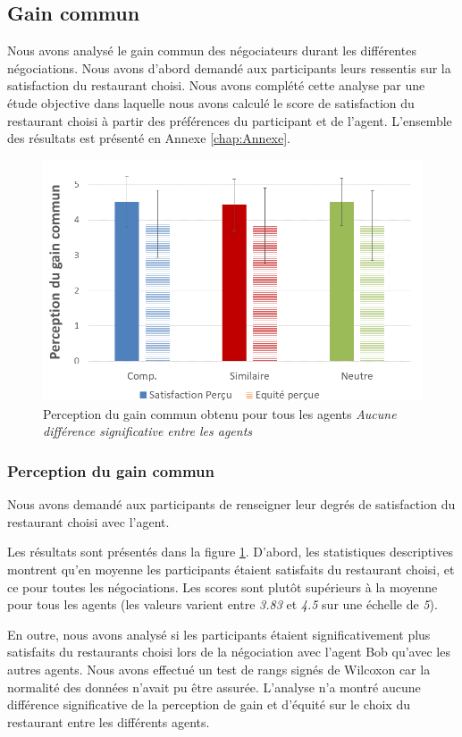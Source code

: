 	\subsection{Gain commun}
	Nous avons analysé le gain commun des négociateurs durant les différentes négociations. Nous avons d'abord demandé aux participants leurs ressentis sur la satisfaction du restaurant choisi. Nous avons complété cette analyse par une étude objective dans laquelle nous avons calculé le score de satisfaction du restaurant choisi à partir des préférences du participant et de l'agent. L'ensemble des résultats est présenté en Annexe \ref{chap:Annexe}.
	
		\begin{figure}[h]
		
		\centering
		\includegraphics[width= 0.65 \linewidth,clip=false]{Figures/chap7/percpGain.PNG}
		\caption{Perception du gain commun obtenu pour tous les agents \textit{Aucune différence significative entre les agents}}
		\label{fig:gainCom}
	\end{figure}

	\subsubsection{Perception du gain commun} Nous avons demandé aux participants de renseigner leur degrés de satisfaction du restaurant choisi avec l'agent.
	
	Les résultats sont présentés dans la figure \ref{fig:gainCom}. D'abord, les statistiques descriptives montrent qu'en moyenne les participants étaient satisfaits du restaurant choisi, et ce pour toutes les négociations. Les scores sont plutôt supérieurs à la moyenne pour tous les agents (les valeurs varient entre \emph{3.83} et \emph{4.5} sur une échelle de \emph{5}). 
	
	En outre, nous avons analysé si les participants étaient significativement plus satisfaits du restaurants choisi lors de la négociation avec l'agent Bob qu'avec les autres agents. Nous avons effectué un test de rangs signés de Wilcoxon car la normalité des données n'avait pu être assurée. L'analyse n'a montré aucune différence significative de la perception de gain et d'équité sur le choix du restaurant entre les différents agents. 
	
